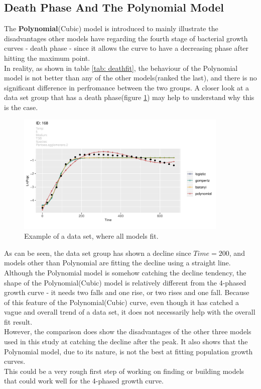 \documentclass[11pt]{article}
\begin{document}
\subsection{Death Phase And The Polynomial Model}
The \textbf{Polynomial}(Cubic) model is introduced to mainly illustrate the disadvantages other models have regarding the fourth stage of bacterial growth curves - death phase - since it allows the curve to have a decreasing phase after hitting the maximum point.\\
In reality, as shown in table \ref{tab: deathfit}, the behaviour of the Polynomial model is not better than any of the other models(ranked the last), and there is no significant difference in perfromance between the two groups. A closer look at a data set group that has a death phase(figure \ref{fig:deathphasedata}) may help to understand why this is the case.
\FloatBarrier
\begin{figure}[!htbp]
    \centering
    \includegraphics[width=0.9\textwidth]{../Results/allPlots/168.pdf}
    \caption{Example of a data set, where all models fit.}
    \label{fig:deathphasedata}
\end{figure}
\FloatBarrier
As can be seen, the data set group has shown a decline since $Time=200$, and models other than Polynomial are fitting the decline using a straight line. Although the Polynomial model is somehow catching the decline tendency, the shape of the Polynomial(Cubic) model is relatively different from the 4-phased growth curve - it needs two falls and one rise, or two rises and one fall. Because of this feature of the Polynomial(Cubic) curve, even though it has catched a vague and overall trend of a data set, it does not necessarily help with the overall fit result.\\
However, the comparison does show the disadvantages of the other three models used in this study at catching the decline after the peak. It also shows that the Polynomial model, due to its nature, is not the best at fitting population growth curves.\\
This could be a very rough first step of working on finding or building models that could work well for the 4-phased growth curve.
\end{document}
